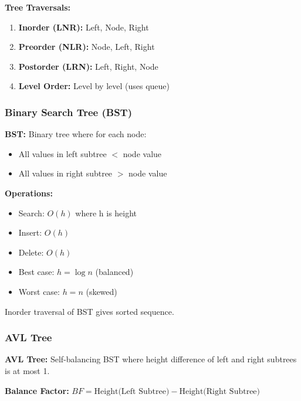 \documentclass[11pt,a4paper]{article}
\begin{document}
\textbf{Tree Traversals:}
\begin{enumerate}
    \item \textbf{Inorder (LNR):} Left, Node, Right
    \item \textbf{Preorder (NLR):} Node, Left, Right
    \item \textbf{Postorder (LRN):} Left, Right, Node
    \item \textbf{Level Order:} Level by level (uses queue)
\end{enumerate}

\subsubsection{Binary Search Tree (BST)}

\begin{defbox}
\textbf{BST:} Binary tree where for each node:
\begin{itemize}
    \item All values in left subtree $<$ node value
    \item All values in right subtree $>$ node value
\end{itemize}
\end{defbox}

\textbf{Operations:}
\begin{itemize}
    \item Search: $O(h)$ where h is height
    \item Insert: $O(h)$
    \item Delete: $O(h)$
    \item Best case: $h = \log n$ (balanced)
    \item Worst case: $h = n$ (skewed)
\end{itemize}

\begin{notebox}
Inorder traversal of BST gives sorted sequence.
\end{notebox}

\subsubsection{AVL Tree}

\begin{defbox}
\textbf{AVL Tree:} Self-balancing BST where height difference of left and right subtrees is at most 1.
\end{defbox}

\textbf{Balance Factor:} $BF = \text{Height(Left Subtree)} - \text{Height(Right Subtree)}$
\end{document}
